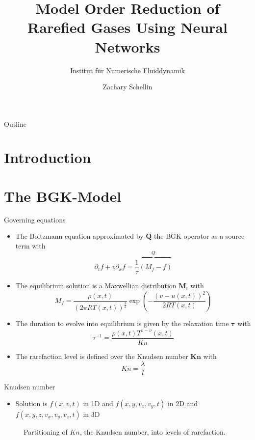 \documentclass[Nike]{tuberlinbeamer}
\title{Model Order Reduction of Rarefied Gases Using Neural Networks}
\subtitle{Institut f\"ur Numerische Fluiddynamik}
\author[Zachary Schellin]{Zachary Schellin}
\institute{Technische Universität Berlin}
\begin{document}
\begin{frame}
\maketitle
\end{frame}


\begin{frame}[fragile]{Outline}
\tableofcontents
\end{frame}
\section{Introduction}

\section{The BGK-Model}
\begin{frame}[fragile]{Governing equations}
	\begin{itemize}
		\item The Boltzmann equation approximated by $\boldsymbol{Q}$ the BGK operator as a source term with
		\begin{equation}
		\partial_t f + v \partial_x f = \overbrace{\frac{1}{\tau} (M_f - f)}^{Q}
		\end{equation}

		\item The equilibrium solution is a Maxwellian distribution $\boldsymbol{M_f}$ with
		\begin{equation}
		M_f = \frac{\rho(x,t)}{(2\pi R T(x,t))^{\frac{3}{2}}}\exp(-\frac{(v - u(x,t))^2}{2 R T(x,t)}) 
		\end{equation}

		\item The duration to evolve into equilibrium is given by the relaxation time $\boldsymbol{\tau}$ with
		\begin{equation}
		\tau^{-1} = \frac{\rho(x,t)T^{1-\nu}(x,t)}{Kn}
		\end{equation}

		\item The rarefaction level is defined over the Knudsen number $\boldsymbol{Kn}$ with
		\begin{equation}
		Kn = \frac{\lambda}{l}
		\end{equation}
	\end{itemize}
\end{frame}

\begin{frame}[fragile]{Knudsen number}
	\begin{itemize}
		\item Solution is $f(x,v,t)$ in 1D and $f(x,y,v_x,v_y,t)$ in 2D and $f(x,y,z,v_x,v_y,v_z,t)$ in 3D 
	\end{itemize}
	\hfill
	\begin{center}
			\begin{figure}
			\centering
			
			\caption{Partitioning of $Kn$, the Knudsen number, into levels of rarefaction.}
			\label{Fig:ExpKN}
		\end{figure}
	\end{center}
\end{frame}
\end{document}
